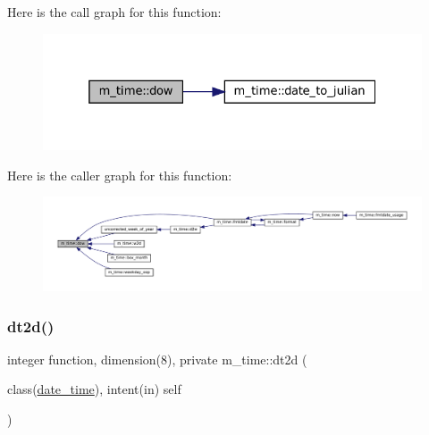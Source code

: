 Here is the call graph for this function\+:\nopagebreak
\begin{figure}[H]
\begin{center}
\leavevmode
\includegraphics[width=325pt]{namespacem__time_adfda8a89820b8d0ad4581a14896e4ce5_cgraph}
\end{center}
\end{figure}
Here is the caller graph for this function\+:\nopagebreak
\begin{figure}[H]
\begin{center}
\leavevmode
\includegraphics[width=350pt]{namespacem__time_adfda8a89820b8d0ad4581a14896e4ce5_icgraph}
\end{center}
\end{figure}
\mbox{\label{namespacem__time_aa281690d7f68f14842b00d238702e774}} 
\subsubsection{\texorpdfstring{dt2d()}{dt2d()}}
{\footnotesize\ttfamily integer function, dimension(8), private m\+\_\+time\+::dt2d (\begin{DoxyParamCaption}\item[{class(\mbox{\hyperlink{structm__time_1_1date__time}{date\+\_\+time}}), intent(in)}]{self }\end{DoxyParamCaption})\hspace{0.3cm}{\ttfamily [private]}}

